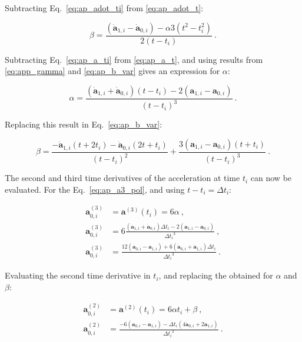 \begin{appendixs}
	Subtracting Eq.~\eqref{eq:ap_adot_ti} from \eqref{eq:ap_adot_t}:
	
	\begin{equation}
		\beta = \frac{(\dot{\mathbf{a}}_{1, i} - \dot{\mathbf{a}}_{0, i}) - \alpha 3 (t^2 - t_i^2)}{2(t - t_i)} ~.\label{eq:ap_b_var}
	\end{equation}
	
	Subtracting Eq.~\eqref{eq:ap_a_ti} from \eqref{eq:ap_a_t}, and using results from \eqref{eq:app_gamma} and \eqref{eq:ap_b_var} gives an expression for $\alpha$:
	
	\begin{equation}
		\alpha = \frac{(\dot{\mathbf{a}}_{1, i} + \dot{\mathbf{a}}_{0, i})(t - t_i) - 2(\mathbf{a}_{1, i} - \mathbf{a}_{0, i})}{(t - t_i)^3} ~. \label{eq:ap_alpha_var}
	\end{equation}
	
	Replacing this result in Eq.~\eqref{eq:ap_b_var}:
	
	\begin{equation}
		\beta = \frac{-\dot{\mathbf{a}}_{1, i}(t + 2 t_i) - \dot{\mathbf{a}}_{0, i}(2 t + t_i)}{(t - t_i)^2} + \frac{3(\mathbf{a}_{1, i} - \mathbf{a}_{0, i})(t + t_i)}{(t - t_i)^3}~.
	\end{equation}
	
	The second and third time derivatives of the acceleration at time $t_i$ can now be evaluated. For the Eq.~\eqref{eq:ap_a3_pol}, and using $t - t_i = \Delta t_i$:
	
	\begin{align}
		\mathbf{a}^{(3)}_{0, i} &= \mathbf{a}^{(3)} (t_i) = 6 \alpha ~,\\
		\mathbf{a}^{(3)}_{0, i} &= 6 \frac{(\dot{\mathbf{a}}_{1, i} + \dot{\mathbf{a}}_{0, i})\Delta t_i - 2(\mathbf{a}_{1, i} - \mathbf{a}_{0, i})}{{\Delta t_i}^3} ~,\\
		\mathbf{a}^{(3)}_{0, i} &= \frac{12 (\mathbf{a}_{0, i} - \mathbf{a}_{1, i}) + 6(\dot{\mathbf{a}}_{0, i} + \dot{\mathbf{a}}_{1, i})\Delta t_i}{{\Delta t_i}^3} ~. \label{eq:ap_a3_ti}
	\end{align}
	
	Evaluating the second time derivative in $t_i$, and replacing the obtained for $\alpha$ and $\beta$:
	
	\begin{align}
		\mathbf{a}^{(2)}_{0, i} &= \mathbf{a}^{(2)} (t_i) = 6 \alpha t_i + \beta ~,\\
		\mathbf{a}^{(2)}_{0, i} &= \frac{-6(\mathbf{a}_{0, i} - \mathbf{a}_{1, i}) - \Delta t_i(4\dot{\mathbf{a}}_{0, i} + 2\dot{\mathbf{a}}_{1, i})}{{\Delta t_i}^2} ~.
	\end{align}
	

\end{appendixs}
